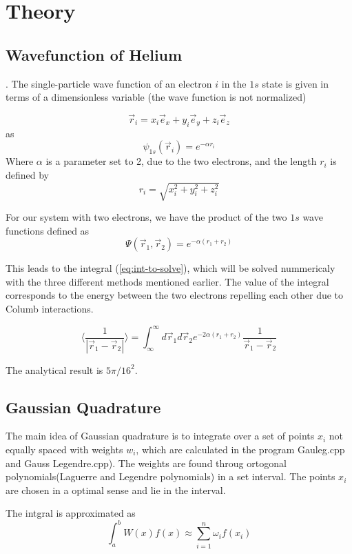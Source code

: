 \documentclass[../main.tex]{subfiles}
\begin{document}
\section{Theory} \label{sec:theory}
\subsection{Wavefunction of Helium} \label{sec:QMProb}.
The single-particle wave function of an electron $i$ in the $1s$ state is given in terms of a dimensionless variable (the wave function is not normalized)

\[\vec{r}_i = x_i \vec{e}_x + y_i \vec{e}_y + z_i \vec{e}_z\]
as
\[\psi_{1s}(\vec{r}_i) = e^{-\alpha r_i}\]
Where $\alpha$ is a parameter set to 2, due to the two electrons, and the length $r_i$ is defined by
\[r_i = \sqrt{x_i^2 + y_i^2 + z_i^2}\]

For our system with two electrons, we have the product of the two $1s$ wave functions defined as
\[\Psi(\vec{r}_1, \vec{r}_2) = e^{-\alpha(r_1 + r_2)}\]

This leads to the integral (\ref{eq:int-to-solve}), which will be solved nummericaly with the three different methods mentioned earlier.
The value of the integral corresponds to the energy between the two electrons repelling each other due to Columb interactions.

\begin{equation}
  \langle \frac{1}{|\vec{r}_1 - \vec{r}_2|} \rangle = \int_{\infty}^\infty d\vec{r}_1 d\vec{r}_2 e^{-2\alpha(r_1 + r_2)} \frac{1}{\vec{r}_1 - \vec{r}_2}
  \label{eq:int-to-solve}
\end{equation}

\vspace{1cm}The analytical result is $5\pi/16^2$.

\subsection{Gaussian Quadrature} \label{sec:GQ}
The main idea of Gaussian quadrature is to integrate over a set of points $x_i$ not equally spaced with weights $w_i$, which are calculated in  the program Gauleg.cpp and Gauss Legendre.cpp). The weights are found throug ortogonal polynomials(Laguerre and Legendre polynomials) in a set interval. The points $x_i$ are chosen in a optimal sense and lie in the interval.

The intgral is approximated as
\[\int_a^b W(x)f(x) \approx \sum_{i=1}^n \omega_i f(x_i) \]
\end{document}
